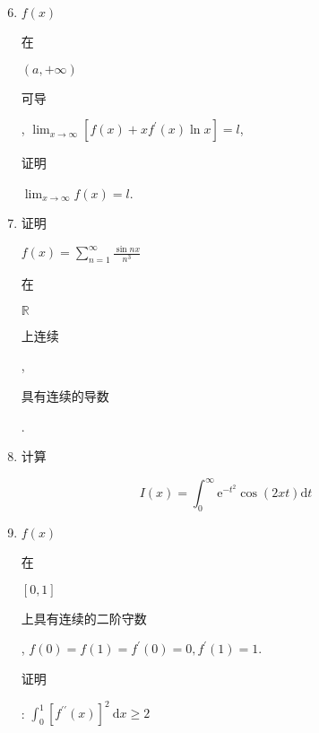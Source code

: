 \documentclass[10pt]{article}
\begin{document}
\begin{enumerate}
  \setcounter{enumi}{5}
  \item $f(x)$ \begin{CJK}{UTF8}{mj}在\end{CJK} $(a,+\infty)$ \begin{CJK}{UTF8}{mj}可导\end{CJK}, $\lim _{x \rightarrow \infty}\left[f(x)+x f^{\prime}(x) \ln x\right]=l$, \begin{CJK}{UTF8}{mj}证明\end{CJK} $\lim _{x \rightarrow \infty} f(x)=l$.

  \item \begin{CJK}{UTF8}{mj}证明\end{CJK} $f(x)=\sum_{n=1}^{\infty} \frac{\sin n x}{n^{3}}$ \begin{CJK}{UTF8}{mj}在\end{CJK} $\mathbb{R}$ \begin{CJK}{UTF8}{mj}上连续\end{CJK}, \begin{CJK}{UTF8}{mj}具有连续的导数\end{CJK}.

  \item \begin{CJK}{UTF8}{mj}计算\end{CJK}

\end{enumerate}
$$
I(x)=\int_{0}^{\infty} \mathrm{e}^{-t^{2}} \cos (2 x t) \mathrm{d} t
$$

\begin{enumerate}
  \setcounter{enumi}{8}
  \item $f(x)$ \begin{CJK}{UTF8}{mj}在\end{CJK} $[0,1]$ \begin{CJK}{UTF8}{mj}上具有连续的二阶守数\end{CJK}, $f(0)=f(1)=f^{\prime}(0)=0, f^{\prime}(1)=1 .$ \begin{CJK}{UTF8}{mj}证明\end{CJK}: $\int_{0}^{1}\left[f^{\prime \prime}(x)\right]^{2} \mathrm{~d} x \geq 2$
\end{enumerate}
\end{document}
